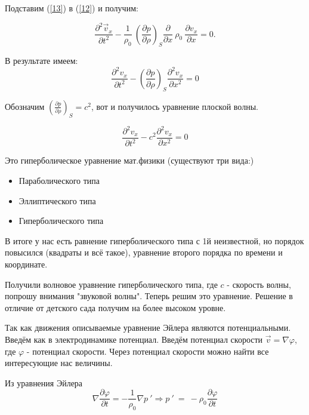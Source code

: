 \documentclass[14pt,a4paper,oneside]{extarticle}	%
\begin{document}
Подставим (\ref{13}) в (\ref{12}) и получим:


\begin{equation}\label{14}
\frac{\partial^{2} \vec{v}_{x}}{\partial t^{2}} - \frac{1}{\rho_{0}}\:\left( \frac{\partial p}{\partial \rho} \right)_{S} \frac{\partial}{\partial x}\:\rho_{0}\: \frac{\partial v_{x}}{\partial x} = 0.
\end{equation}

В результате имеем:
\begin{equation}\label{15}
\frac{\partial^{2} v_{x}}{\partial t^{2}} - \left( \frac{\partial p}{\partial \rho} \right)_{S}
\frac{\partial^{2} v_{x}}{\partial x^{2}} = 0
\end{equation}

Обозначим $ \left( \frac{\partial p}{\partial \rho} \right)_{S} = c^{2} $, вот и получилось уравнение плоской волны.

\begin{equation}\label{16}
\frac{\partial^{2} v_{x}}{\partial t^{2}} - c^{2}
\frac{\partial^{2} v_{x}}{\partial x^{2}} = 0
\end{equation}

Это гиперболическое уравнение мат.физики 
(существуют три вида:)
\begin{itemize}
	\item Параболического типа
	\item Эллиптического типа 
	\item  Гиперболического типа 
\end{itemize}

В итоге у нас есть равнение гиперболического типа с 1й неизвестной, но порядок повысился (квадраты и всё такое), уравнение второго порядка по времени и координате.

Получили волновое уравнение гиперболического типа, где
$ c $ - скорость волны, попрошу внимания "звуковой волны". Теперь решим это уравнение.
Решение в отличие от детского сада получим на более высоком уровне.

Так как движения описываемые уравнение Эйлера являются потенциальными.
Введём как в электродинамике потенциал. Введём потенциал скорости $ \vec{v} = \nabla \varphi $, где $ \varphi $ - потенциал скорости. Через потенциал скорости можно найти все интересующие нас величины.

Из уравнения Эйлера 
\begin{equation}\label{17}
\nabla\frac{\partial \varphi}{\partial t} = - \frac{1}{\rho_{0}}\nabla p\:' \Rightarrow p\:' \: = \: - \rho_{0} \frac{\partial \varphi}{\partial t}
\end{equation}
\end{document}
